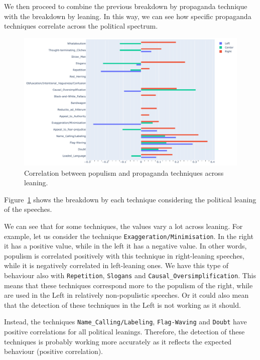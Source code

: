We then proceed to combine the previous breakdown by propaganda technique with the breakdown by leaning. In this way, we can see how specific propaganda techniques correlate across the political spectrum.

\begin{figure}[!htbp]
    \centering
    \includegraphics[width=\linewidth]{figures/populism_propaganda_correlation_by_leaning.pdf}
    \caption{Correlation between populism and propaganda techniques across leaning.}
    \label{fig:populism_propaganda_correlation_by_leaning}
\end{figure}

Figure~\ref{fig:populism_propaganda_correlation_by_leaning} shows the breakdown by each technique considering the political leaning of the speeches.

We can see that for some techniques, the values vary a lot across leaning. For example, let us consider the technique \texttt{Exaggeration/Minimisation}. In the right it has a positive value, while in the left it has a negative value. %
In other words, populism is correlated positively with this technique in right-leaning speeches, while it is negatively correlated in left-leaning ones. We have this type of behaviour also with \texttt{Repetition}, \texttt{Slogans} and \texttt{Causal\_Oversimplification}. This means that these techniques correspond more to the populism of the right, while are used in the Left in relatively non-populistic speeches.
Or it could also mean that the detection of these techniques in the Left is not working as it should.

Instead, the techniques \texttt{Name\_Calling/Labeling}, \texttt{Flag-Waving} and \texttt{Doubt} have positive correlations for all political leanings.
Therefore, the detection of these techniques is probably working more accurately as it reflects the expected behaviour (positive correlation).

